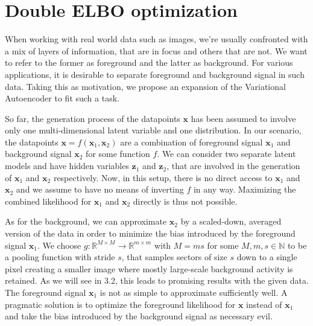 \documentclass[12pt]{report}
\theoremstyle{definition}
\begin{document}
\section{Double ELBO optimization}
When working with real world data such as images, we're usually confronted with a mix of layers of information, that are in focus and others that are not. We want to refer to the former as foreground and the latter as background. For various applications, it is desirable to separate foreground and background signal in such data. Taking this as motivation, we propose an expansion of the Variational Autoencoder to fit such a task.

So far, the generation process of the datapoints $\mathbf{x}$ has been assumed to involve only one multi-dimensional latent variable and one distribution. In our scenario, the datapoints $\mathbf{x} = f(\mathbf{x}_1, \mathbf{x}_2)$ are a combination of foreground signal $\mathbf{x}_1$ and background signal $\mathbf{x}_2$ for some function $f$.
We can consider two separate latent models and have hidden variables $\mathbf{z}_1$ and $\mathbf{z}_2$, that are involved in the generation of $\mathbf{x}_1$ and $\mathbf{x}_2$ respectively. Now, in this setup, there is no direct access to $\mathbf{x}_1$ and $\mathbf{x}_2$ and we assume to have no means of inverting $f$ in any way. Maximizing the combined likelihood for $\mathbf{x}_1$ and $\mathbf{x}_2$ directly is thus not possible.

As for the background, we can approximate $\mathbf{x}_2$ by a scaled-down, averaged version of the data in order to minimize the bias introduced by the foreground signal $\mathbf{x}_1$. We choose $g: \mathbb{R}^{M \times M} \rightarrow \mathbb{R}^{m \times m}$ with $M=ms$ for some $M, m, s \in \mathbb{N}$ to be a pooling function with stride $s$, that samples sectors of size $s$ down to a single pixel creating a smaller image where mostly large-scale background activity is retained. As we will see in 3.2, this leads to promising results with the given data.
The foreground signal $\mathbf{x}_1$ is not as simple to approximate sufficiently well. A pragmatic solution is to optimize the foreground likelihood for $\mathbf{x}$ instead of $\mathbf{x}_1$ and take the bias introduced by the background signal as necessary evil.
\end{document}
